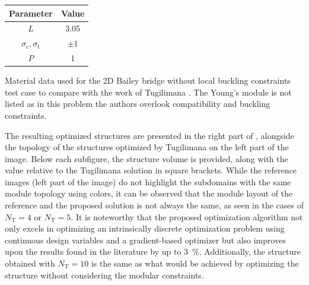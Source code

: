 \begin{margintable}
    \small
    \centering
    \begin{tabular}{cc}
    \toprule
    \textbf{Parameter}        & \textbf{Value} \\ \midrule
    $L$              & 3.05     \\
    $\sigma_\text{c}, \sigma_\text{t}$ & $\pm 1$\\
    $P$              & 1   \\
    \bottomrule
    \end{tabular}
    \caption{Material data used for the 2D Bailey bridge without local buckling constraints test case to compare with the work of Tugilimana \etal \cite{tugilimana_integrated_2019}. The Young's module is not listed as in this problem the authors overlook compatibility and buckling constraints.}
    \label{tab:06_modular_tug}
\end{margintable}

The resulting optimized structures are presented in the right part of , alongside the topology of the structures optimized by Tugilimana \etal \cite{tugilimana_integrated_2019} on the left part of the image. Below each subfigure, the structure volume is provided, along with the value relative to the Tugilimana solution in square brackets. While the reference images (left part of the image) do not highlight the subdomains with the same module topology using colors, it can be observed that the module layout of the reference and the proposed solution is not always the same, as seen in the cases of $N_\text{T}=4$ or $N_\text{T}=5$. It is noteworthy that the proposed optimization algorithm not only excels in optimizing an intrinsically discrete optimization problem using continuous design variables and a gradient-based optimizer but also improves upon the results found in the literature by up to \qty{3}{\percent}. Additionally, the structure obtained with $N_\text{T}=10$ is the same as what would be achieved by optimizing the structure without considering the modular constraints.

